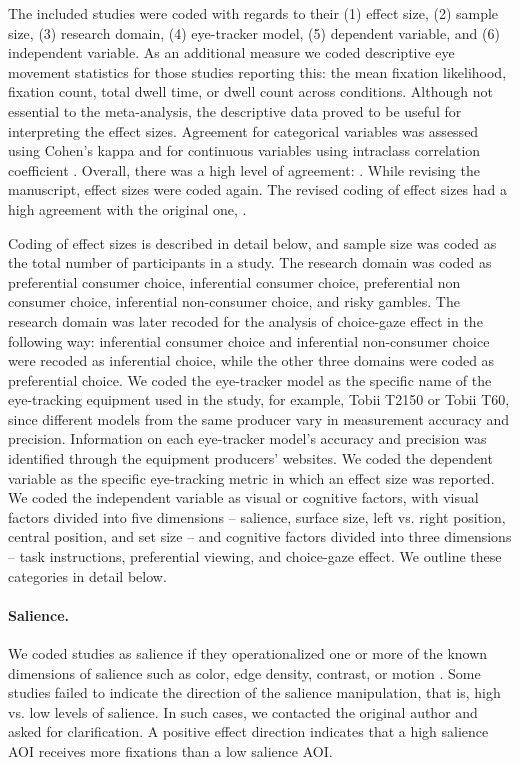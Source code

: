 The included studies were coded with regards to their (1) effect size, (2) sample size, (3) research domain, (4) eye-tracker model, (5) dependent variable, and (6) independent variable. As an additional measure we coded descriptive eye movement statistics for those studies reporting this: the mean fixation likelihood, fixation count, total dwell time, or dwell count across conditions. Although not essential to the meta-analysis, the descriptive data proved to be useful for interpreting the effect sizes. Agreement for categorical variables was assessed using Cohen's kappa and for continuous variables using intraclass correlation coefficient \citep{shrout1979a}. Overall, there was a high level of agreement: . While revising the manuscript, effect sizes were coded again. The revised coding of effect sizes had a high agreement with the original one,  \unskip.

Coding of effect sizes is described in detail below, and sample size was coded as the total number of participants in a study. The research domain was coded as preferential consumer choice, inferential consumer choice, preferential non consumer choice, inferential non-consumer choice, and risky gambles. The research domain was later recoded for the analysis of choice-gaze effect in the following way: inferential consumer choice and inferential non-consumer choice were recoded as inferential choice, while the other three domains were coded as preferential choice. We coded the eye-tracker model as the specific name of the eye-tracking equipment used in the study, for example, Tobii T2150 or Tobii T60, since different models from the same producer vary in measurement accuracy and precision. Information on each eye-tracker model's accuracy and precision was identified through the equipment producers' websites. We coded the dependent variable as the specific eye-tracking metric in which an effect size was reported. We coded the independent variable as visual or cognitive factors, with visual factors divided into five dimensions -- salience, surface size, left vs. right position, central position, and set size -- and cognitive factors divided into three dimensions -- task instructions, preferential viewing, and choice-gaze effect. We outline these categories in detail below. 

\paragraph{Salience.} We coded studies as salience if they operationalized one or more of the known dimensions of salience such as color, edge density, contrast, or motion \citep{itti2000}. Some studies failed to indicate the direction of the salience manipulation, that is, high vs. low levels of salience. In such cases, we contacted the original author and asked for clarification. A positive effect direction indicates that a high salience AOI receives more fixations than a low salience AOI.

